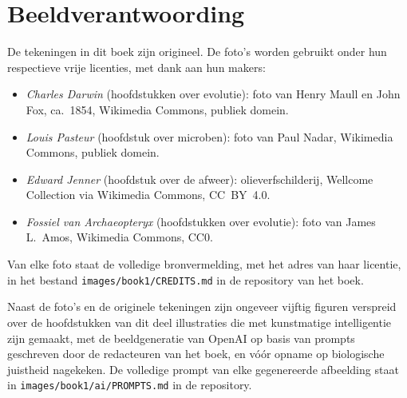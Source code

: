 \chapter*{Beeldverantwoording}

De tekeningen in dit boek zijn origineel. De foto's worden gebruikt
onder hun respectieve vrije licenties, met dank aan hun makers:

\begin{itemize}
  \item \emph{Charles Darwin} (hoofdstukken over evolutie): foto van
        Henry Maull en John Fox, ca.~1854, Wikimedia Commons,
        publiek domein.
  \item \emph{Louis Pasteur} (hoofdstuk over microben): foto van
        Paul Nadar, Wikimedia Commons, publiek domein.
  \item \emph{Edward Jenner} (hoofdstuk over de afweer): olieverfschilderij,
        Wellcome Collection via Wikimedia Commons, CC~BY~4.0.
  \item \emph{Fossiel van Archaeopteryx} (hoofdstukken over evolutie):
        foto van James L.~Amos, Wikimedia Commons, CC0.
\end{itemize}

Van elke foto staat de volledige bronvermelding, met het adres van haar
licentie, in het bestand
\texttt{images/book1/CREDITS.md} in de repository van het boek.

\bigskip
Naast de foto's en de originele tekeningen zijn ongeveer vijftig
figuren verspreid over de hoofdstukken van dit deel illustraties die
met kunstmatige intelligentie zijn gemaakt, met de beeldgeneratie van
OpenAI op basis van prompts geschreven door de redacteuren van het
boek, en vóór opname op biologische juistheid nagekeken. De volledige
prompt van elke gegenereerde afbeelding staat in
\texttt{images/book1/ai/PROMPTS.md} in de repository.
\clearpage
